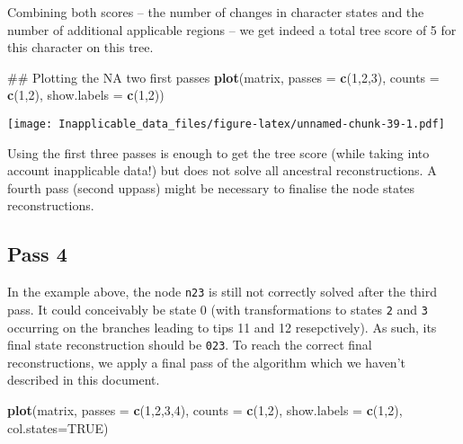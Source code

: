 \documentclass[]{book}
\newenvironment{Shaded}{\begin{snugshade}}{\end{snugshade}}
\newcommand{\KeywordTok}[1]{\textcolor[rgb]{0.13,0.29,0.53}{\textbf{#1}}}
\newcommand{\DataTypeTok}[1]{\textcolor[rgb]{0.13,0.29,0.53}{#1}}
\newcommand{\DecValTok}[1]{\textcolor[rgb]{0.00,0.00,0.81}{#1}}
\newcommand{\OtherTok}[1]{\textcolor[rgb]{0.56,0.35,0.01}{#1}}
\newcommand{\NormalTok}[1]{#1}
\theoremstyle{definition}
\theoremstyle{definition}
\theoremstyle{definition}
\theoremstyle{remark}
\begin{document}
Combining both scores -- the number of changes in character states and
the number of additional applicable regions -- we get indeed a total
tree score of 5 for this character on this tree.

\begin{Shaded}
\begin{Highlighting}[]
\NormalTok{## Plotting the NA two first passes}
\KeywordTok{plot}\NormalTok{(matrix, }\DataTypeTok{passes =} \KeywordTok{c}\NormalTok{(}\DecValTok{1}\NormalTok{,}\DecValTok{2}\NormalTok{,}\DecValTok{3}\NormalTok{), }\DataTypeTok{counts =} \KeywordTok{c}\NormalTok{(}\DecValTok{1}\NormalTok{,}\DecValTok{2}\NormalTok{), }\DataTypeTok{show.labels =} \KeywordTok{c}\NormalTok{(}\DecValTok{1}\NormalTok{,}\DecValTok{2}\NormalTok{))}
\end{Highlighting}
\end{Shaded}

\texttt{[image: Inapplicable\_data\_files/figure-latex/unnamed-chunk-39-1.pdf]}

Using the first three passes is enough to get the tree score (while
taking into account inapplicable data!) but does not solve all ancestral
reconstructions. A fourth pass (second uppass) might be necessary to
finalise the node states reconstructions.

\hypertarget{pass-4}{%
\subsection{Pass 4}\label{pass-4}}

In the example above, the node \texttt{n23} is still not correctly
solved after the third pass. It could conceivably be state 0 (with
transformations to states \texttt{2} and \texttt{3} occurring on the
branches leading to tips 11 and 12 resepctively). As such, its final
state reconstruction should be \texttt{023}. To reach the correct final
reconstructions, we apply a final pass of the algorithm which we haven't
described in this document.

\begin{Shaded}
\begin{Highlighting}[]
\KeywordTok{plot}\NormalTok{(matrix, }\DataTypeTok{passes =} \KeywordTok{c}\NormalTok{(}\DecValTok{1}\NormalTok{,}\DecValTok{2}\NormalTok{,}\DecValTok{3}\NormalTok{,}\DecValTok{4}\NormalTok{), }\DataTypeTok{counts =} \KeywordTok{c}\NormalTok{(}\DecValTok{1}\NormalTok{,}\DecValTok{2}\NormalTok{), }\DataTypeTok{show.labels =} \KeywordTok{c}\NormalTok{(}\DecValTok{1}\NormalTok{,}\DecValTok{2}\NormalTok{), }\DataTypeTok{col.states=}\OtherTok{TRUE}\NormalTok{)}
\end{Highlighting}
\end{Shaded}
\end{document}
